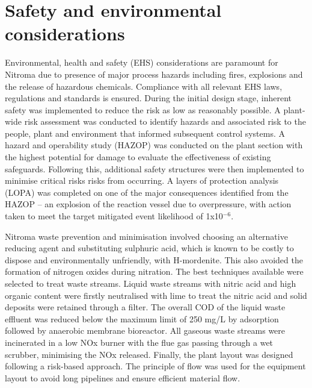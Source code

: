 \section*{Safety and environmental considerations}

Environmental, health and safety (EHS) considerations are paramount for Nitroma due to presence of major process hazards including fires, explosions and the release of hazardous chemicals. Compliance with all relevant EHS laws, regulations and standards is ensured.  During the initial design stage, inherent safety was implemented to reduce the risk as low as reasonably possible. A plant-wide risk assessment was conducted to identify hazards and associated risk to the people, plant and environment that informed subsequent control systems. A hazard and operability study (HAZOP) was conducted on the plant section with the highest potential for damage to evaluate the effectiveness of existing safeguards. Following this, additional safety structures were then implemented to minimise critical risks risks from occurring. A layers of protection analysis (LOPA) was completed on one of the major consequences identified from the HAZOP – an explosion of the reaction vessel due to overpressure, with action taken to meet the target mitigated event likelihood of 1x10$^{-6}$.  

Nitroma waste prevention and minimisation involved choosing an alternative reducing agent and substituting sulphuric acid, which is known to be costly to dispose and environmentally unfriendly, with H-mordenite. This also avoided the formation of nitrogen oxides during nitration. The best techniques available were selected to treat waste streams. Liquid waste streams with nitric acid and high organic content were firstly neutralised with lime to treat the nitric acid and solid deposits were retained through a filter. The overall COD of the liquid waste effluent was reduced below the maximum limit of 250 mg/L by adsorption followed by anaerobic membrane bioreactor. All gaseous waste streams were incinerated in a low NOx burner with the flue gas passing through a wet scrubber, minimising the NOx released. Finally, the plant layout was designed following a risk-based approach. The principle of flow was used for the equipment layout to avoid long pipelines and ensure efficient material flow. 